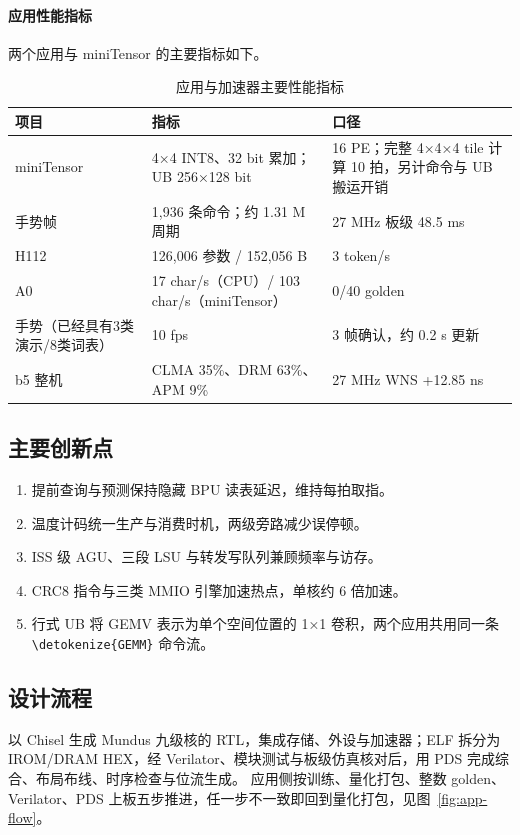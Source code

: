 \documentclass[UTF8,a4paper,12pt,fontset=none,scheme=plain]{ctexart}
\newcommand{\code}[1]{\texttt{\detokenize{#1}}}
\renewcommand{\code}[1]{{\small\ttfamily\urlstyle{tt}\expandafter\nolinkurl\expandafter{\detokenize{#1}}}}
\begin{document}
\paragraph{应用性能指标}
两个应用与 miniTensor 的主要指标如下。

\begin{table}[H]
\centering
\caption{应用与加速器主要性能指标}
\label{tab:app-metrics}
\begin{tabularx}{\linewidth}{@{}P{2.5cm}X P{4.4cm}@{}}
\toprule
项目 & 指标 & 口径 \\
\midrule
miniTensor & 4×4 INT8、32 bit 累加；UB 256×128 bit & 16 PE；完整 4×4×4 tile 计算 10 拍，另计命令与 UB 搬运开销 \\
手势帧 & 1,936 条命令；约 1.31 M 周期 & 27 MHz 板级 48.5 ms \\
H112 & 126,006 参数 / 152,056 B & 3 token/s \\
A0 & 17 char/s（CPU）/ 103 char/s（miniTensor） & 0/40 golden \\
手势（已经具有3类演示/8类词表） & 10 fps & 3 帧确认，约 0.2 s 更新 \\
b5 整机 & CLMA 35\%、DRM 63\%、APM 9\% & 27 MHz WNS +12.85 ns \\
\bottomrule
\end{tabularx}
\end{table}

\subsection{主要创新点}
\begin{enumerate}[label=\arabic*.]
\item 提前查询与预测保持隐藏 BPU 读表延迟，维持每拍取指。
\item 温度计码统一生产与消费时机，两级旁路减少误停顿。
\item ISS 级 AGU、三段 LSU 与转发写队列兼顾频率与访存。
\item CRC8 指令与三类 MMIO 引擎加速热点，单核约 6 倍加速。
\item 行式 UB 将 GEMV 表示为单个空间位置的 1×1 卷积，两个应用共用同一条 \code{GEMM} 命令流。
\end{enumerate}

\subsection{设计流程}
以 Chisel 生成 Mundus 九级核的 RTL，集成存储、外设与加速器；ELF 拆分为 IROM/DRAM HEX，经 Verilator、模块测试与板级仿真核对后，用 PDS 完成综合、布局布线、时序检查与位流生成。
应用侧按训练、量化打包、整数 golden、Verilator、PDS 上板五步推进，任一步不一致即回到量化打包，见图~\ref{fig:app-flow}。
\end{document}

